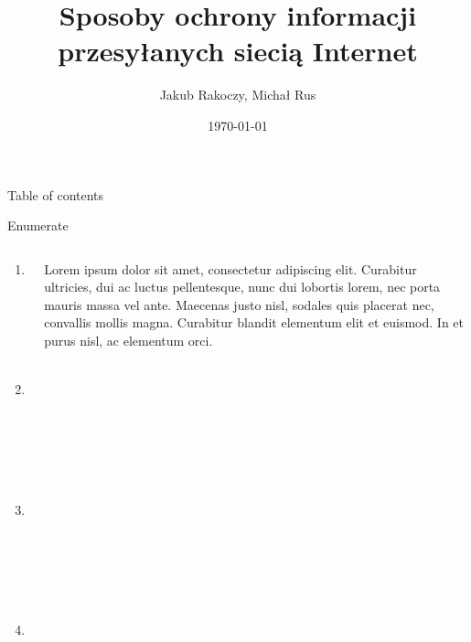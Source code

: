 \documentclass{beamer}
\begin{document}
\title[Sposoby ochrony informacji przesyłanych siecią Internet]{Sposoby ochrony informacji przesyłanych siecią Internet} 
\author{Jakub Rakoczy, Michał Rus} 
\date{\today} 

\begin{frame}[plain]
  \titlepage
\end{frame}


\begin{frame}{Table of contents}
  \tableofcontents
\end{frame}









\begin{frame}{Enumerate}
\begin{columns}
  \begin{column}{0.49\paperwidth}
      \begin{enumerate}
        \item Lorem ;
        \item<2-> Ipsum ;
        \item<2-> Dolor ;
        \item<2-> Sit amet.
      \end{enumerate}
  \end{column}

  \begin{column}{0.49\paperwidth}
    Lorem ipsum dolor sit amet, consectetur adipiscing elit. Curabitur 
    ultricies, dui ac luctus pellentesque, nunc dui lobortis lorem, nec 
    porta mauris massa vel ante. Maecenas justo nisl, sodales quis 
    placerat nec, convallis mollis magna. Curabitur blandit elementum 
    elit et euismod. In et purus nisl, ac elementum orci.
  \end{column}
\end{columns}

\end{frame}
\end{document}
